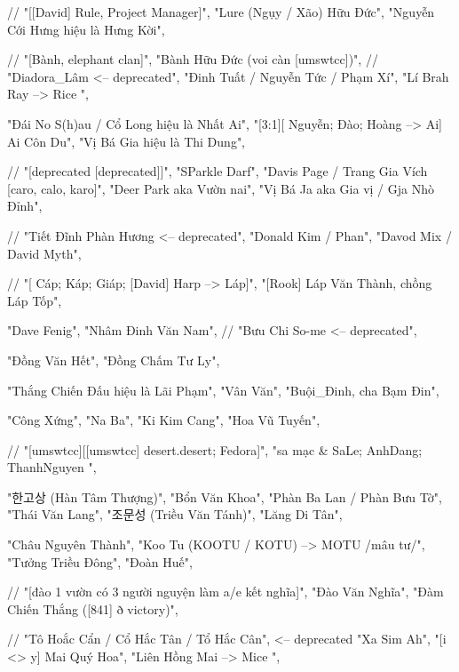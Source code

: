             // "[[David] Rule, Project Manager]",
            "Lure (Ngụy / Xão) Hữu Đức",
            "Nguyễn Cới Hưng hiệu là Hưng Kời",

            // "[Bành, elephant clan]",
            "Bành Hữu Đức (voi càn [umswtcc])",
            // "Diadora_Lâm <-- deprecated",
            "Đinh Tuất / Nguyễn Tức / Phạm Xí",
            "Lí Brah { Ray --> Rice }",
        
            "Đái No S(h)au / Cổ Long hiệu là Nhất Ai",
            "[3:1][{ Nguyễn; Đào; Hoàng } --> Ai] Ai Côn Du",
            "Vị Bá Gia hiệu là Thi Dung",

            // "[deprecated [deprecated]]",
            "SParkle Darf",
            "Davis Page / Trang Gia Vích [caro, calo, karo]",
            "Deer Park aka Vườn nai",
            "Vị Bá Ja aka Gia vị / Gja Nhò Đỉnh",

            // "Tiết Đĩnh Phàn Hương <-- deprecated",
            "Donald Kim / Phan",
            "Davod Mix / David Myth",

            // "[{ Cáp; Káp; Giáp; [David] Harp } --> Láp]",
            "[Rook] Láp Văn Thành, chồng Láp Tốp",

            "Dave Fenig",
            "Nhâm Đinh Văn Nam",
            // "Bưu Chi So-me <-- deprecated",

            "Đồng Văn Hết",
            "Đồng Chấm Tư Ly",

            "Thắng Chiến Đấu hiệu là Lãi Phạm",
            "Vân Văn",
            "Buội_Đinh, cha Bạm Đin",

            "Công Xứng",
            "Na Ba",
            "Ki Kim Cang",
            "Hoa Vũ Tuyến",

            // "[umswtcc][[umswtcc] desert.desert; Fedora]",
            "sa mạc & { SaLe; AnhDang; ThanhNguyen }",

            "한고상 (Hàn Tâm Thượng)",
            "Bổn Văn Khoa",
            "Phàn Ba Lan / Phàn Bưu Tờ",
            "Thái Văn Lang",
            "조문성 (Triều Văn Tánh)",
            "Lăng Di Tân",

            "Châu Nguyên Thành",
            "Koo Tu (KOOTU / KOTU) --> MOTU /mâu tư/",
            "Tưởng Triều Đông",
            "Đoàn Huế",

            // "[đào 1 vườn có 3 người nguyện làm a/e kết nghĩa]",
            "Đào Văn Nghĩa",
            "Đàm Chiến Thắng ([841] ð victory)",

            // "Tô Hoắc Cẩn / Cổ Hắc Tân / Tổ Hắc Cân", <-- deprecated
            "Xa Sim Ah",
            "[i <> y] Mai Quý Hoa",
            "Liên Hồng { Mai --> Mice }",

